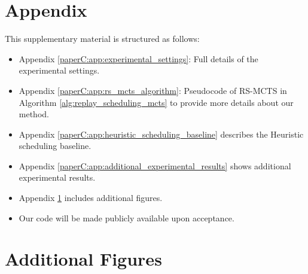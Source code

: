 

\section*{Appendix}
This supplementary material is structured as follows: 
\begin{itemize}
    \item Appendix \ref{paperC:app:experimental_settings}: Full details of the experimental settings.
    \item Appendix \ref{paperC:app:rs_mcts_algorithm}: Pseudocode of RS-MCTS in Algorithm \ref{alg:replay_scheduling_mcts} to provide more details about our method. 
    \item Appendix \ref{paperC:app:heuristic_scheduling_baseline} describes the Heuristic scheduling baseline.
    \item Appendix \ref{paperC:app:additional_experimental_results} shows additional experimental results. 
    \item Appendix \ref{paperC:app:additional_figures} includes additional figures. 
    \item Our code %
    will be made publicly available upon acceptance. 
\end{itemize}






%
%

%









\section{Additional Figures}\label{paperC:app:additional_figures}

